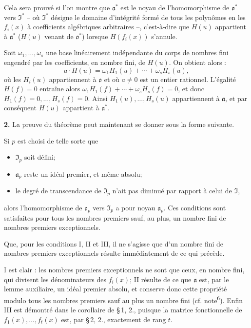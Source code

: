 Cela sera prouvé si l'on montre que $\mathfrak{a}^*$ est le noyau de l'homomorphisme de $\mathfrak{o}^*$ vers $\mathfrak{I}^*$ -- où $\mathfrak{I}^*$ désigne le domaine d'intégrité formé de tous les polynômes en les $f_i(x)$ à coefficients algébriques arbitraires --, c'est-à-dire que $H(u)$ appartient à $\mathfrak{a}^*$ ($H(u)$ venant de $\mathfrak{o}^*$) lorsque $H(f_i(x))$ s'annule.

Soit $\omega_1,\ldots,\omega_s$ une base linéairement indépendante du corps de nombres fini engendré par les coefficients, en nombre fini, de $H(u)$. On obtient alors :
\[
a\cdot H(u)=\omega_1H_1(u)+\cdots+\omega_sH_s(u),
\]
où les $H_i(u)$ appartiennent à $\mathfrak{o}$ et où $a\ne0$ est un entier rationnel. L'égalité $H(f)=0$ entraîne alors $\omega_1H_1(f)+\cdots+\omega_sH_s(f)=0$, et donc $H_1(f)=0,\ldots,H_s(f)=0$. Ainsi $H_1(u),\ldots,H_s(u)$ appartiennent à $\mathfrak{a}$, et par conséquent $H(u)$ appartient à $\mathfrak{a}^*$.

\medskip
\noindent\textbf{2.}
La preuve du théorème peut maintenant se donner sous la forme suivante.

Si $p$ est choisi de telle sorte que
\begin{itemize}
\item[I.] $\mathfrak{I}_p$ soit défini;
\item[II.] $\mathfrak{a}_p$ reste un idéal premier, et même absolu;
\item[III.] le degré de transcendance de $\mathfrak{I}_p$ n'ait pas diminué par rapport à celui de $\mathfrak{I}$,
\end{itemize}
alors l'homomorphisme de $\mathfrak{o}_p$ vers $\mathfrak{I}_p$ a pour noyau $\mathfrak{a}_p$. Ces conditions sont satisfaites pour tous les nombres premiers sauf, au plus, un nombre fini de nombres premiers exceptionnels.

Que, pour les conditions I, II et III, il ne s'agisse que d'un nombre fini de nombres premiers exceptionnels résulte immédiatement de ce qui précède.

I est clair : les nombres premiers exceptionnels ne sont que ceux, en nombre fini, qui divisent les dénominateurs des $f_i(x)$; II résulte de ce que $\mathfrak{a}$ est, par le lemme auxiliaire, un idéal premier absolu, et conserve donc cette propriété modulo tous les nombres premiers sauf au plus un nombre fini (cf. note\textsuperscript{6}). Enfin III est démontré dans le corollaire de \S\,1, 2., puisque la matrice fonctionnelle de $f_1(x),\ldots,f_t(x)$ est, par \S\,2, 2., exactement de rang $t$.


